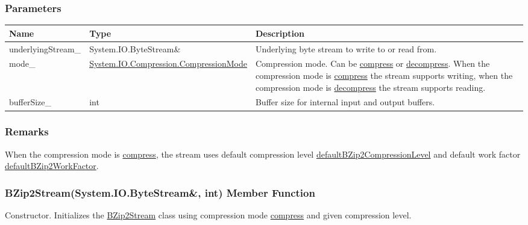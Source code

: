 \documentclass[a4paper,oneside,11.000000pt]{book}
\begin{document}
\subsubsection*{Parameters}
\begin{flushleft}
\begin{supertabular}[l]{!{\raggedright}p{4.10323cm}!{\raggedright}p{5.76344cm}!{\raggedright}p{4.93333cm}}
\textbf{Name}
& \textbf{Type}
& \textbf{Description}
\\
\hline
underlyingStream\_
& System.\-IO.\-ByteStream\&\-
& Underlying byte stream to write to or read from.

\\
mode\_
& \hyperlink{System.IO.Compression.CompressionMode}{System.\-IO.\-Compression.\-CompressionMode}
& Compression mode. Can be \hyperlink{System.IO.Compression.CompressionMode.compress}{compress} or \hyperlink{System.IO.Compression.CompressionMode.decompress}{decompress}.
When the compression mode is \hyperlink{System.IO.Compression.CompressionMode.compress}{compress} the stream supports writing,
when the compression mode is \hyperlink{System.IO.Compression.CompressionMode.decompress}{decompress} the stream supports reading.

\\
bufferSize\_
& int
& Buffer size for internal input and output buffers.

\\
\end{supertabular}

\end{flushleft}
\subsubsection*{Remarks}
\begin{flushleft}
When the compression mode is \hyperlink{System.IO.Compression.CompressionMode.compress}{compress}, the stream uses default compression level \hyperlink{System.IO.Compression.defaultBZip2CompressionLevel}{defaultBZip2CompressionLevel} and 
default work factor \hyperlink{System.IO.Compression.defaultBZip2WorkFactor}{defaultBZip2WorkFactor}.

\end{flushleft}
\clearpage

\hypertarget{System.IO.Compression.BZip2Stream.constructor.P.System.IO.Compression.BZip2Stream.R.System.IO.ByteStream.int}{\subsubsection*{BZip2Stream(System.IO.ByteStream\&, int) Member Function}}
\begin{flushleft}
Constructor. Initializes the \hyperlink{System.IO.Compression.BZip2Stream}{BZip2Stream} class using compression mode \hyperlink{System.IO.Compression.CompressionMode.compress}{compress} and given compression level.

\end{flushleft}
\end{document}
